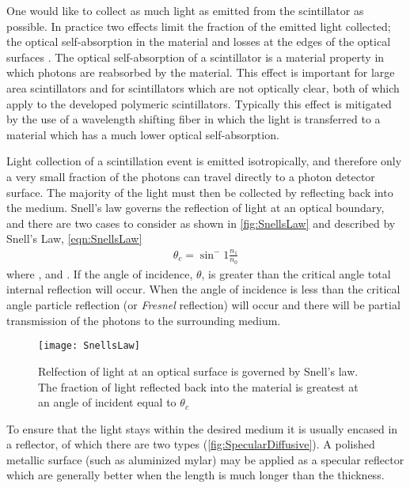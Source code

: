 One would like to collect as much light as emitted from the scintillator as possible.
In practice two effects limit the fraction of the emitted light collected; the optical self-absorption in the material and losses at the edges of the optical surfaces \cite{knoll_radiation_2009}.
The optical self-absorption of a scintillator is a material property in which photons are reabsorbed by the material.
This effect is important for large area scintillators and for scintillators which are not optically  clear, both of which apply to the developed polymeric scintillators.
Typically this effect is mitigated by the use of a wavelength shifting fiber in which the light is transferred to a material which has a much lower optical self-absorption.

Light collection of a scintillation event is emitted isotropically, and therefore only a very small fraction of the photons can travel directly to a photon detector surface.
The majority of the light must then be collected by reflecting back into the medium.
Snell's law governs the reflection of light at an optical boundary, and there are two cases to consider as shown in \autoref{fig:SnellsLaw} and described by Snell's Law, \eqref{eqn:SnellsLaw}
\begin{align}
	\theta_c = \sin^-1 \frac{n_1}{n_0}
	\label{eqn:SnellsLaw}
\end{align}
where ,  and .
If the angle of incidence, $\theta$, is greater than the critical angle total internal reflection will occur.
When the angle of incidence is less than the critical angle particle reflection (or \textit{Fresnel} reflection) will occur and there will be partial transmission of the photons to the surrounding medium.
\begin{figure}
	\centering
	\texttt{[image: SnellsLaw]}
	\caption[Light Reflection at a Boundary]{Relfection of light at an optical surface is governed by Snell's law.  The fraction of light reflected back into the material is greatest at an angle of incident equal to $\theta_c$}
	\label{fig:SnellsLaw}
\end{figure}
To ensure that the light stays within the desired medium it is usually encased in a reflector, of which there are two types (\autoref{fig:SpecularDiffusive}).
A polished metallic surface (such as aluminized mylar) may be applied as a specular reflector which are generally better when the length is much longer than the thickness\cite{SaintGobain_DAM_2012}.
